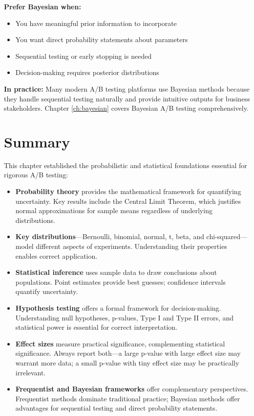 \textbf{Prefer Bayesian when:}
\begin{itemize}
    \item You have meaningful prior information to incorporate
    \item You want direct probability statements about parameters
    \item Sequential testing or early stopping is needed
    \item Decision-making requires posterior distributions
\end{itemize}

\textbf{In practice:} Many modern A/B testing platforms use Bayesian methods because they handle sequential testing naturally and provide intuitive outputs for business stakeholders. Chapter \ref{ch:bayesian} covers Bayesian A/B testing comprehensively.

\section{Summary}

This chapter established the probabilistic and statistical foundations essential for rigorous A/B testing:

\begin{itemize}
    \item \textbf{Probability theory} provides the mathematical framework for quantifying uncertainty. Key results include the Central Limit Theorem, which justifies normal approximations for sample means regardless of underlying distributions.

    \item \textbf{Key distributions}—Bernoulli, binomial, normal, t, beta, and chi-squared—model different aspects of experiments. Understanding their properties enables correct application.

    \item \textbf{Statistical inference} uses sample data to draw conclusions about populations. Point estimates provide best guesses; confidence intervals quantify uncertainty.

    \item \textbf{Hypothesis testing} offers a formal framework for decision-making. Understanding null hypotheses, p-values, Type I and Type II errors, and statistical power is essential for correct interpretation.

    \item \textbf{Effect sizes} measure practical significance, complementing statistical significance. Always report both—a large p-value with large effect size may warrant more data; a small p-value with tiny effect size may be practically irrelevant.

    \item \textbf{Frequentist and Bayesian frameworks} offer complementary perspectives. Frequentist methods dominate traditional practice; Bayesian methods offer advantages for sequential testing and direct probability statements.
\end{itemize}

